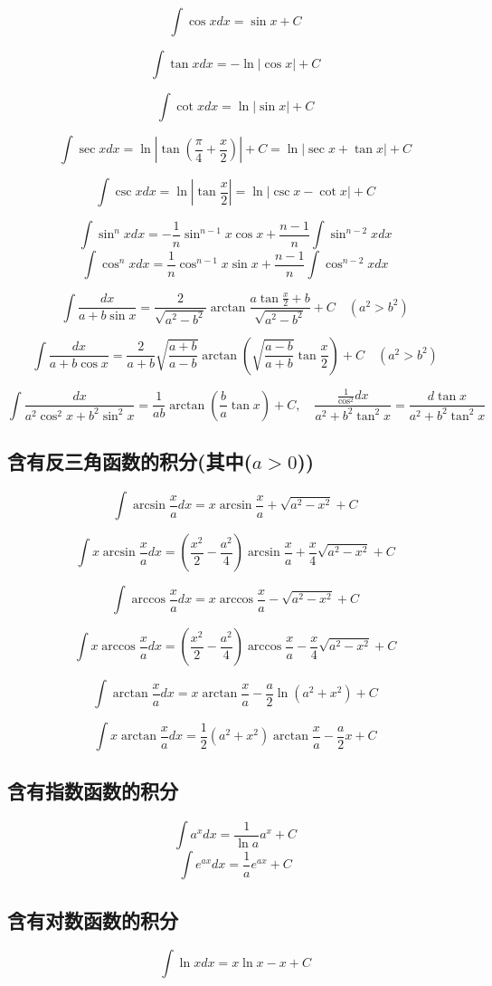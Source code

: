 $$
\int \cos xdx =\sin x +C
$$

$$
\int \tan xdx=-\ln|\cos x|+C
$$

$$
\int \cot xdx=\ln|\sin x|+C
$$

$$
\int \sec xdx=\ln|\tan(\frac{\pi}{4}+\frac{x}{2})|+C=\ln|\sec x+ \tan x|+C
$$

$$
\int \csc xdx=\ln|\tan \frac{x}{2}|=\ln|\csc x-\cot x|+C
$$


$$
\int \sin^n x dx=-\frac{1}{n}\sin^{n-1}x \cos x + \frac{n-1}{n}\int \sin^{n-2}x dx
$$
$$
\int \cos^n x dx=\frac{1}{n}\cos^{n-1}x \sin x + \frac{n-1}{n}\int \cos^{n-2}x dx
$$


$$
\int \frac{dx}{a+b\sin x}=\frac{2}{\sqrt{a^2-b^2}}\arctan \frac{a \tan \frac{x}{2}+b}{\sqrt{a^2-b^2}}+C \quad(a^2>b^2)
$$

$$
\int \frac{dx}{a+b\cos x}=\frac{2}{a+b} \sqrt{\frac{a+b}{a-b}}\arctan(\sqrt{\frac{a-b}{a+b}}\tan \frac{x}{2})+C \quad (a^2>b^2)
$$


$$
\int \frac{ dx}{a^2 \cos^2 x+b^2\sin^2 x}=\frac{ 1}{ab} \arctan(\frac{b}{a}\tan x)+C, \quad
\frac{\frac{1}{\cos^2}dx}{a^2+b^2\tan^2 x}=\frac{d \tan x}{a^2 + b^2 \tan^2 x}
$$

\subsection{含有反三角函数的积分(其中($a>0$))}
$$
\int \arcsin \frac{x}{a}dx=x\arcsin \frac{x}{a}+\sqrt{a^2-x^2}+C
$$

$$
\int x\arcsin \frac{x}{a}dx=(\frac{x^2}{2}-\frac{ a^2}{4})\arcsin \frac{x}{a}+ \frac{x}{4}\sqrt{a^2-x^2}+C
$$

$$
\int \arccos \frac{x}{a}dx=x \arccos \frac{x}{a}-\sqrt{a^2-x^2}+C
$$

$$
\int x\arccos \frac{x}{a}dx=(\frac{x^2}{2}-\frac{ a^2}{4})\arccos \frac{x}{a}- \frac{x}{4}\sqrt{a^2-x^2}+C
$$

$$
\int \arctan \frac{x}{a}dx=x \arctan \frac{x}{a}-\frac{a}{2}\ln(a^2+x^2)+C
$$

$$
\int x \arctan \frac{x}{a}dx=\frac{1}{2}(a^2+x^2)\arctan \frac{x}{a}- \frac{a}{2}x+C
$$
\subsection{含有指数函数的积分}
$$
\int a^xdx=\frac{1}{\ln a}a^x+C
$$
$$
\int e^{ax}dx=\frac{ 1}{a}e^{ax}+C
$$

\subsection{含有对数函数的积分}
$$
\int \ln xdx=x\ln x-x +C
$$

